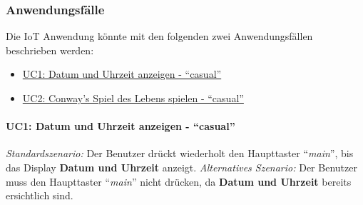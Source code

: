 \documentclass[11pt,ngerman]{article}
\newcommand{\quotes}[1]{``#1''}
\begin{document}
    \subsubsection{Anwendungsfälle}
    \label{sssec:Anwendungsfälle}
    Die IoT Anwendung könnte mit den folgenden zwei Anwendungsfällen beschrieben werden:
    \begin{itemize}
        \item  \hyperref[p:UC1datetime]{UC1: Datum und Uhrzeit anzeigen - \quotes{casual}}
        \item\hyperref[p:UC2Spielspielen]{UC2: Conway's Spiel des Lebens spielen - \quotes{casual}}
    \end{itemize}

    \paragraph{UC1: Datum und Uhrzeit anzeigen - \quotes{casual}}
    \label{p:UC1datetime}
    \begin{tcolorbox}[enhanced, breakable, sharp corners, width=\dimexpr\textwidth-15mm\relax ,enlarge left by=10mm ,fontupper=\linespread{1.1}\selectfont, boxrule=1pt, title={UC1: Datum und Uhrzeit anzeigen}, colback=white, colframe=gray!22, coltitle=black]
         \textit{Standardszenario:} \newline
         Der Benutzer drückt wiederholt den Haupttaster \quotes{\textit{main}}, bis das Display \textbf{Datum und Uhrzeit} anzeigt. \newline
        \newline
        \textit{Alternatives Szenario:} \newline
        Der Benutzer muss den Haupttaster \quotes{\textit{main}} nicht drücken, da \textbf{Datum und Uhrzeit} bereits ersichtlich sind.
    \end{tcolorbox}
\end{document}
